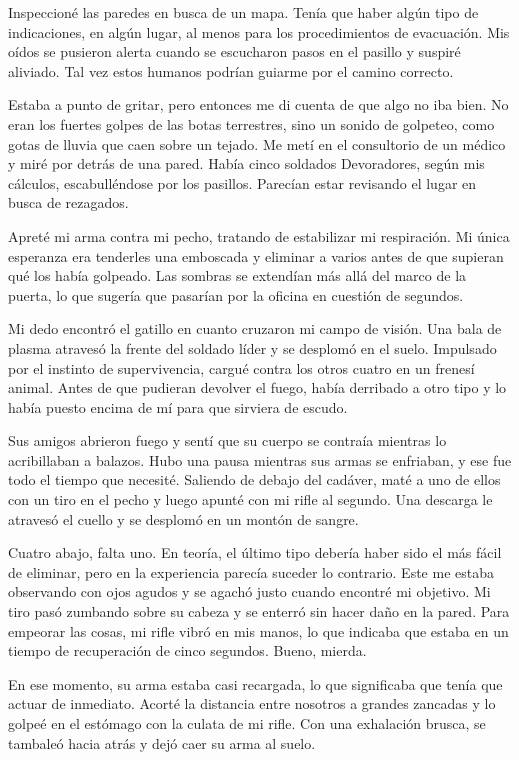 Inspeccioné las paredes en busca de un mapa. Tenía que haber algún tipo de indicaciones, en algún lugar, al menos para los procedimientos de evacuación. Mis oídos se pusieron alerta cuando se escucharon pasos en el pasillo y suspiré aliviado. Tal vez estos humanos podrían guiarme por el camino correcto.

Estaba a punto de gritar, pero entonces me di cuenta de que algo no iba bien. No eran los fuertes golpes de las botas terrestres, sino un sonido de golpeteo, como gotas de lluvia que caen sobre un tejado. Me metí en el consultorio de un médico y miré por detrás de una pared. Había cinco soldados Devoradores, según mis cálculos, escabulléndose por los pasillos. Parecían estar revisando el lugar en busca de rezagados.

Apreté mi arma contra mi pecho, tratando de estabilizar mi respiración. Mi única esperanza era tenderles una emboscada y eliminar a varios antes de que supieran qué los había golpeado. Las sombras se extendían más allá del marco de la puerta, lo que sugería que pasarían por la oficina en cuestión de segundos.

Mi dedo encontró el gatillo en cuanto cruzaron mi campo de visión. Una bala de plasma atravesó la frente del soldado líder y se desplomó en el suelo. Impulsado por el instinto de supervivencia, cargué contra los otros cuatro en un frenesí animal. Antes de que pudieran devolver el fuego, había derribado a otro tipo y lo había puesto encima de mí para que sirviera de escudo.

Sus amigos abrieron fuego y sentí que su cuerpo se contraía mientras lo acribillaban a balazos. Hubo una pausa mientras sus armas se enfriaban, y ese fue todo el tiempo que necesité. Saliendo de debajo del cadáver, maté a uno de ellos con un tiro en el pecho y luego apunté con mi rifle al segundo. Una descarga le atravesó el cuello y se desplomó en un montón de sangre.

Cuatro abajo, falta uno. En teoría, el último tipo debería haber sido el más fácil de eliminar, pero en la experiencia parecía suceder lo contrario. Este me estaba observando con ojos agudos y se agachó justo cuando encontré mi objetivo. Mi tiro pasó zumbando sobre su cabeza y se enterró sin hacer daño en la pared. Para empeorar las cosas, mi rifle vibró en mis manos, lo que indicaba que estaba en un tiempo de recuperación de cinco segundos. Bueno, mierda.

En ese momento, su arma estaba casi recargada, lo que significaba que tenía que actuar de inmediato. Acorté la distancia entre nosotros a grandes zancadas y lo golpeé en el estómago con la culata de mi rifle. Con una exhalación brusca, se tambaleó hacia atrás y dejó caer su arma al suelo.

